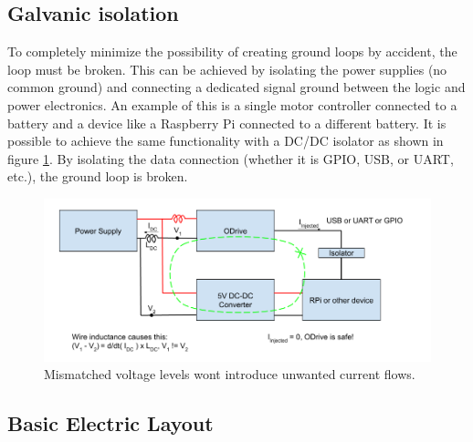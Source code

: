     \subsection{Galvanic isolation}
    
    To completely minimize the possibility of creating ground loops by accident, the loop must be broken. This can be achieved by isolating the power supplies (no common ground) and connecting a dedicated signal ground between the logic and power electronics. An example of this is a single motor controller connected to a battery and a device like a Raspberry Pi connected to a different battery. It is possible to achieve the same functionality with a DC/DC isolator as shown in figure \ref{ground_loop_fix}. By isolating the data connection (whether it is GPIO, USB, or UART, etc.), the ground loop is broken.
    
    \begin{figure}[h]
    \includegraphics[width=\textwidth]{contents/figures/ground_loop_fix.png}
    \caption{Mismatched voltage levels wont introduce unwanted current flows.}
    \label{ground_loop_fix}
    \end{figure}

    \clearpage
    \subsection{Basic Electric Layout}

